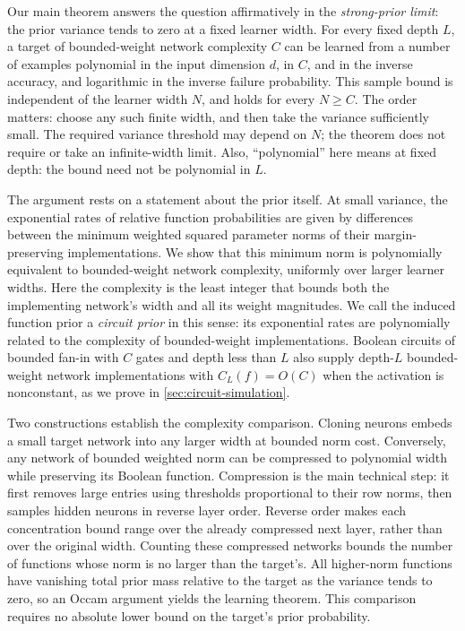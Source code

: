 \documentclass[11pt]{article}
\theoremstyle{definition}
\begin{document}
Our main theorem answers the question affirmatively in the \emph{strong-prior limit}: the prior variance tends to zero at a fixed learner width. For every fixed depth $L$, a target of bounded-weight network complexity $C$ can be learned from a number of examples polynomial in the input dimension $d$, in $C$, and in the inverse accuracy, and logarithmic in the inverse failure probability. This sample bound is independent of the learner width $N$, and holds for every $N\geq C$. The order matters: choose any such finite width, and then take the variance sufficiently small. The required variance threshold may depend on $N$; the theorem does not require or take an infinite-width limit. Also, ``polynomial'' here means at fixed depth: the bound need not be polynomial in $L$.

The argument rests on a statement about the prior itself. At small variance, the exponential rates of relative function probabilities are given by differences between the minimum weighted squared parameter norms of their margin-preserving implementations. We show that this minimum norm is polynomially equivalent to bounded-weight network complexity, uniformly over larger learner widths. Here the complexity is the least integer that bounds both the implementing network's width and all its weight magnitudes. We call the induced function prior a \emph{circuit prior} in this sense: its exponential rates are polynomially related to the complexity of bounded-weight implementations. Boolean circuits of bounded fan-in with $C$ gates and depth less than $L$ also supply depth-$L$ bounded-weight network implementations with $C_L(f)=O(C)$ when the activation is nonconstant, as we prove in \cref{sec:circuit-simulation}.

Two constructions establish the complexity comparison. Cloning neurons embeds a small target network into any larger width at bounded norm cost. Conversely, any network of bounded weighted norm can be compressed to polynomial width while preserving its Boolean function. Compression is the main technical step: it first removes large entries using thresholds proportional to their row norms, then samples hidden neurons in reverse layer order. Reverse order makes each concentration bound range over the already compressed next layer, rather than over the original width. Counting these compressed networks bounds the number of functions whose norm is no larger than the target's. All higher-norm functions have vanishing total prior mass relative to the target as the variance tends to zero, so an Occam argument yields the learning theorem. This comparison requires no absolute lower bound on the target's prior probability.
\end{document}
